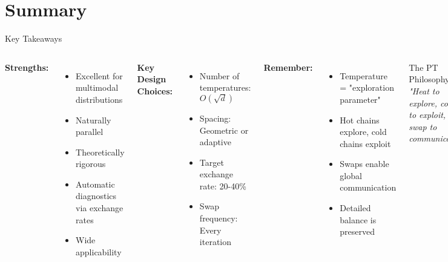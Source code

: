 \documentclass[aspectratio=169]{beamer}
\begin{document}
\section{Summary}

\begin{frame}{Key Takeaways}
\begin{columns}
\textbf{Strengths:}
\begin{itemize}
    \item Excellent for multimodal distributions %
    \item Naturally parallel %
    \item Theoretically rigorous %
    \item Automatic diagnostics via exchange rates %
    \item Wide applicability %
\end{itemize}

\vspace{0.5cm}
\textbf{Key Design Choices:}
\begin{itemize}
    \item Number of temperatures: $O(\sqrt{d})$
    \item Spacing: Geometric or adaptive
    \item Target exchange rate: 20-40\%
    \item Swap frequency: Every iteration
\end{itemize}

\textbf{Remember:}
\begin{itemize}
    \item Temperature = "exploration parameter"
    \item Hot chains explore, cold chains exploit
    \item Swaps enable global communication
    \item Detailed balance is preserved
\end{itemize}

\vspace{0.5cm}
\begin{block}{The PT Philosophy}
\textit{"Heat to explore, cool to exploit, swap to communicate"}
\end{block}

\vspace{0.3cm}
\textbf{Active Research Areas:}
\begin{itemize}
    \item Optimal temperature schedules
    \item Non-reversible variants
    \item Machine learning integration
    \item Application to deep learning
\end{itemize}
\end{columns}
\end{frame}
\end{document}
